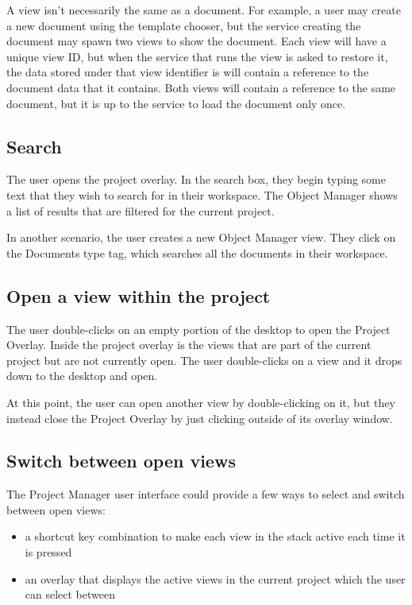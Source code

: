 \documentclass[11pt]{report}
\newcommand{\proman}{Project Manager\xspace}
\begin{document}
A view isn't necessarily the same as a document. For example, a user may create a new document using the template chooser, but the service creating the document may spawn two views to show the document. Each view will have a unique view ID, but when the service that runs the view is asked to restore it, the data stored under that view identifier is will contain a reference to the document data that it contains. Both views will contain a reference to the same document, but it is up to the service to load the document only once.

\subsection{Search}

The user opens the project overlay. In the search box, they begin typing some text that they wish to search for in their workspace. The Object Manager shows a list of results that are filtered for the current project.

In another scenario, the user creates a new Object Manager view. They click on the Documents type tag, which searches all the documents in their workspace.

\subsection{Open a view within the project}
The user double-clicks on an empty portion of the desktop to open the Project Overlay. Inside the project overlay is the views that are part of the current project but are not currently open. The user double-clicks on a view and it drops down to the desktop and open. 

At this point, the user can open another view by double-clicking on it, but they instead close the Project Overlay by just clicking outside of its overlay window.

\subsection{Switch between open views}
The \proman user interface could provide a few ways to select and switch between open views:
\begin{itemize}
\item a shortcut key combination to make each view in the stack active each time it is pressed
\item an overlay that displays the active views in the current project which the user can select between
\end{itemize}
\end{document}

